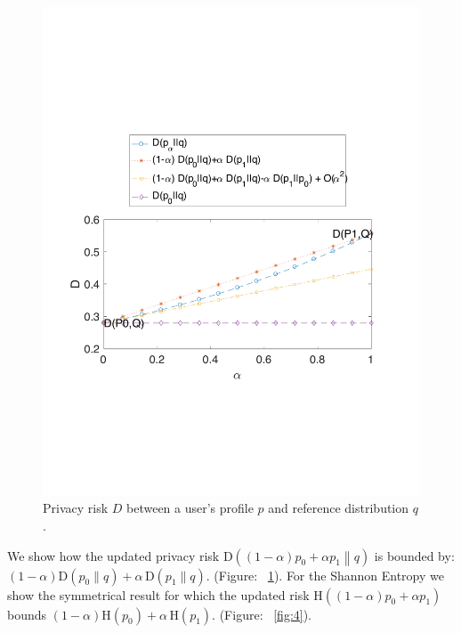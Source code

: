 \begin{figure}[htb]
\centering
\includegraphics[scale=0.5]{figures/example_1_D.pdf}
\caption{Privacy risk $D$ between a user's profile $p$ and reference distribution $q$.}
\label{fig:3}
\end{figure}

We show how the updated privacy risk $\text{D}\left((1-\alpha)p_0+\alpha p_1\middle\|q\right)$ is bounded by: $(1-\alpha)\text{D}(p_0\|q)+\alpha\,\text{D}(p_1\|q).$ (Figure: ~\ref{fig:3}). For the Shannon Entropy we show the symmetrical result for which the updated risk $\text{H}\left((1-\alpha)p_0+\alpha p_1\right)$ bounds $(1-\alpha)\text{H}(p_0)+\alpha\,\text{H}(p_1).$ (Figure: ~\ref{fig:4}).

